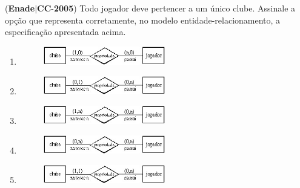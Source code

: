 \documentclass{exam}
\begin{document}
\begin{questions}
\question (\textbf{Enade}$|$\textbf{CC}-\textbf{2005}) Todo jogador deve pertencer a um único clube.
Assinale a opção que representa corretamente, no modelo
entidade-relacionamento, a especificação apresentada acima.
	\begin{enumerate}[label=\alph*)]
		\item  
\begin{figure}[H]
	\begin{center}
		\includegraphics[width=0.5\textwidth]{CIENCIA_DA_COMPUTACAO_Prova2005-utf8_figuras/fig-0010.jpg}
	\end{center}
\end{figure}
		\item  
\begin{figure}[H]
	\begin{center}
		\includegraphics[width=0.5\textwidth]{CIENCIA_DA_COMPUTACAO_Prova2005-utf8_figuras/fig-0011.jpg}
	\end{center}
\end{figure}
		\item  
\begin{figure}[H]
	\begin{center}
		\includegraphics[width=0.5\textwidth]{CIENCIA_DA_COMPUTACAO_Prova2005-utf8_figuras/fig-0012.jpg}
	\end{center}
\end{figure}
		\item  
\begin{figure}[H]
	\begin{center}
		\includegraphics[width=0.5\textwidth]{CIENCIA_DA_COMPUTACAO_Prova2005-utf8_figuras/fig-0013.jpg}
	\end{center}
\end{figure}
		\item  
\begin{figure}[H]
	\begin{center}
		\includegraphics[width=0.5\textwidth]{CIENCIA_DA_COMPUTACAO_Prova2005-utf8_figuras/fig-0014.jpg}
	\end{center}
\end{figure}


\end{enumerate}
\end{questions}
\end{document}
